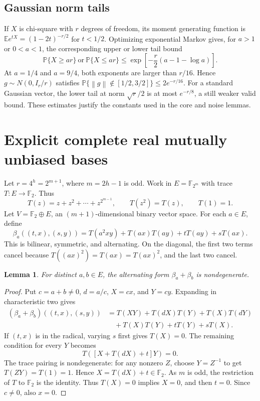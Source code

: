 \documentclass[11pt,letterpaper]{article}
\newtheorem{lemma}[theorem]{Lemma}
\theoremstyle{definition}
\theoremstyle{remark}
\numberwithin{equation}{section}
\newcommand{\F}{\mathbb F}
\newcommand{\E}{\mathbb E}
\newcommand{\Prob}{\mathbb P}
\newcommand{\norm}[1]{\left\lVert#1\right\rVert}
\begin{document}
\subsection{Gaussian norm tails}
If $X$ is chi-square with $r$ degrees of freedom, its moment generating function is $\E e^{tX}=(1-2t)^{-r/2}$ for $t<1/2$. Optimizing exponential Markov gives, for $a>1$ or $0<a<1$, the corresponding upper or lower tail bound
\[
 \Prob\{X\ge ar\}\ \text{or}\ \Prob\{X\le ar\}
 \le\exp\!\left[-\frac r2(a-1-\log a)\right].
\]
At $a=1/4$ and $a=9/4$, both exponents are larger than $r/16$. Hence $g\sim N(0,I_r/r)$ satisfies
$\Prob\{\norm{g}\notin[1/2,3/2]\}\le2e^{-r/16}$.
For a standard Gaussian vector, the lower tail at norm $\sqrt r/2$ is at most $e^{-r/8}$, a still weaker valid bound. These estimates justify the constants used in the core and noise lemmas.

\section{Explicit complete real mutually unbiased bases}\label{app:MUB}
Let $r=4^h=2^{m+1}$, where $m=2h-1$ is odd. Work in $E=\F_{2^m}$ with trace $T:E\to\F_2$. Thus
\[
 T(z)=z+z^2+\cdots+z^{2^{m-1}},\qquad T(z^2)=T(z),\qquad T(1)=1.
\]
Let $V=\F_2\oplus E$, an $(m+1)$-dimensional binary vector space. For each $a\in E$, define
\begin{equation}\label{eq:binaryform}
 \beta_a((t,x),(s,y))=
 T(a^2xy)+T(ax)T(ay)+tT(ay)+sT(ax).
\end{equation}
This is bilinear, symmetric, and alternating. On the diagonal, the first two terms cancel because $T((ax)^2)=T(ax)=T(ax)^2$, and the last two cancel.

\begin{lemma}\label{lem:nondegenerate}
For distinct $a,b\in E$, the alternating form $\beta_a+\beta_b$ is nondegenerate.
\end{lemma}
\begin{proof}
Put $c=a+b\ne0$, $d=a/c$, $X=cx$, and $Y=cy$. Expanding in characteristic two gives
\begin{align*}
 (\beta_a+\beta_b)((t,x),(s,y))
 &=T(XY)+T(dX)T(Y)+T(X)T(dY)\\
 &\quad+T(X)T(Y)+tT(Y)+sT(X).
\end{align*}
If $(t,x)$ is in the radical, varying $s$ first gives $T(X)=0$. The remaining condition for every $Y$ becomes
\[
 T([X+T(dX)+t]Y)=0.
\]
The trace pairing is nondegenerate: for any nonzero $Z$, choose $Y=Z^{-1}$ to get $T(ZY)=T(1)=1$. Hence $X=T(dX)+t\in\F_2$. As $m$ is odd, the restriction of $T$ to $\F_2$ is the identity. Thus $T(X)=0$ implies $X=0$, and then $t=0$. Since $c\ne0$, also $x=0$.
\end{proof}
\end{document}
